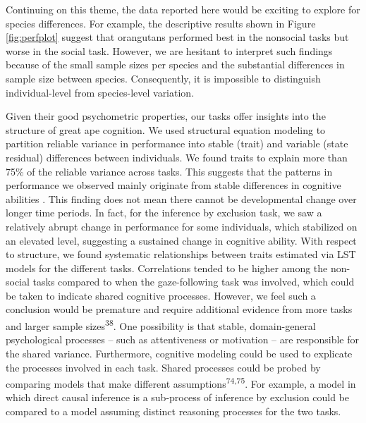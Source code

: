 \documentclass[
  man,floatsintext]{apa6}
\begin{document}
Continuing on this theme, the data reported here would be exciting to explore for species differences. For example, the descriptive results shown in Figure \ref{fig:perfplot} suggest that orangutans performed best in the nonsocial tasks but worse in the social task. However, we are hesitant to interpret such findings because of the small sample sizes per species and the substantial differences in sample size between species. Consequently, it is impossible to distinguish individual-level from species-level variation.

Given their good psychometric properties, our tasks offer insights into the structure of great ape cognition. We used structural equation modeling to partition reliable variance in performance into stable (trait) and variable (state residual) differences between individuals. We found traits to explain more than 75\% of the reliable variance across tasks. This suggests that the patterns in performance we observed mainly originate from stable differences in cognitive abilities . This finding does not mean there cannot be developmental change over longer time periods. In fact, for the inference by exclusion task, we saw a relatively abrupt change in performance for some individuals, which stabilized on an elevated level, suggesting a sustained change in cognitive ability. With respect to structure, we found systematic relationships between traits estimated via LST models for the different tasks. Correlations tended to be higher among the non-social tasks compared to when the gaze-following task was involved, which could be taken to indicate shared cognitive processes. However, we feel such a conclusion would be premature and require additional evidence from more tasks and larger sample sizes\textsuperscript{38}. One possibility is that stable, domain-general psychological processes -- such as attentiveness or motivation -- are responsible for the shared variance. Furthermore, cognitive modeling could be used to explicate the processes involved in each task. Shared processes could be probed by comparing models that make different assumptions\textsuperscript{74,75}. For example, a model in which direct causal inference is a sub-process of inference by exclusion could be compared to a model assuming distinct reasoning processes for the two tasks.
\end{document}
